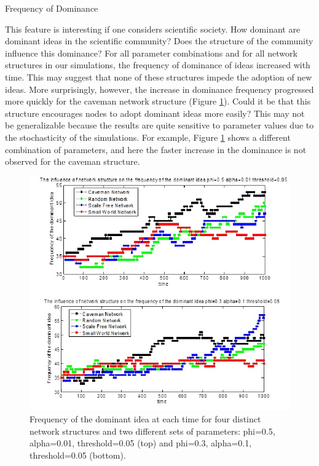 \documentclass{beamer}
\begin{document}
\begin{frame}
{Frequency of Dominance}

This feature is interesting if one considers scientific society. How dominant are dominant ideas in the scientific community? Does the structure of the community influence this dominance? For all parameter combinations and for all network structures in our simulations, the frequency of dominance of ideas increased with time. This may suggest that none of these structures impede the adoption of new ideas. More surprisingly, however, the increase in dominance frequency progressed more quickly for the caveman network structure (Figure \ref{fig2}). Could it be that this structure encourages nodes to adopt dominant ideas more easily? This may not be generalizable because the results are quite sensitive to parameter values due to the stochasticity of the simulations. For example, Figure \ref{fig2} shows a different combination of parameters, and here the faster increase in the dominance is not observed for the caveman structure.

\begin{figure}
[htp]
\begin{center}
\includegraphics{figex}
\end{center}
\caption{Frequency of the dominant idea at each time for four distinct network structures and two different sets of parameters: phi=0.5, alpha=0.01, threshold=0.05 (top) and phi=0.3, alpha=0.1, threshold=0.05 (bottom).}
\label {fig2}
\end{figure}

\end{frame}
\end{document}
